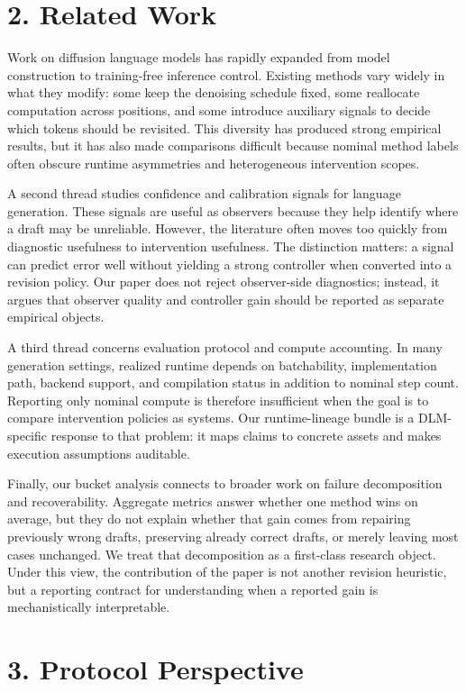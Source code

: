 \documentclass{article}
\begin{document}
\section{2. Related Work}

Work on diffusion language models has rapidly expanded from model construction to training-free inference control. Existing methods vary widely in what they modify: some keep the denoising schedule fixed, some reallocate computation across positions, and some introduce auxiliary signals to decide which tokens should be revisited. This diversity has produced strong empirical results, but it has also made comparisons difficult because nominal method labels often obscure runtime asymmetries and heterogeneous intervention scopes.

A second thread studies confidence and calibration signals for language generation. These signals are useful as observers because they help identify where a draft may be unreliable. However, the literature often moves too quickly from diagnostic usefulness to intervention usefulness. The distinction matters: a signal can predict error well without yielding a strong controller when converted into a revision policy. Our paper does not reject observer-side diagnostics; instead, it argues that observer quality and controller gain should be reported as separate empirical objects.

A third thread concerns evaluation protocol and compute accounting. In many generation settings, realized runtime depends on batchability, implementation path, backend support, and compilation status in addition to nominal step count. Reporting only nominal compute is therefore insufficient when the goal is to compare intervention policies as systems. Our runtime-lineage bundle is a DLM-specific response to that problem: it maps claims to concrete assets and makes execution assumptions auditable.

Finally, our bucket analysis connects to broader work on failure decomposition and recoverability. Aggregate metrics answer whether one method wins on average, but they do not explain whether that gain comes from repairing previously wrong drafts, preserving already correct drafts, or merely leaving most cases unchanged. We treat that decomposition as a first-class research object. Under this view, the contribution of the paper is not another revision heuristic, but a reporting contract for understanding when a reported gain is mechanistically interpretable.

\section{3. Protocol Perspective}
\end{document}
